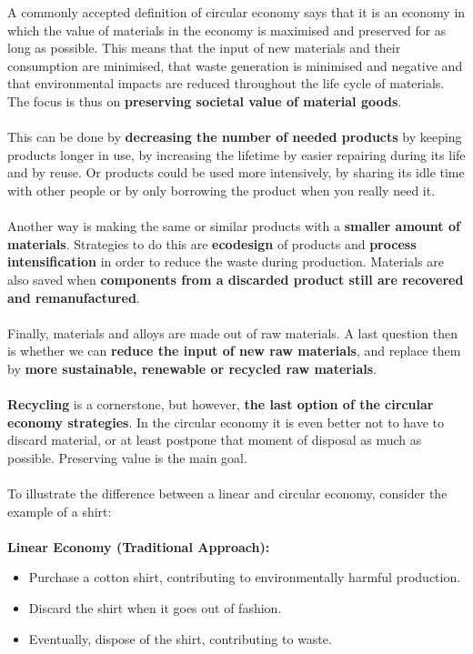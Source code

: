 \documentclass[../summary.tex]{subfiles}
\begin{document}
	A commonly accepted definition of circular economy says that it is an economy in which the value of materials in the economy is maximised and preserved for as long as possible. This means that the input of new materials and their consumption are minimised, that waste generation is minimised and negative and that environmental impacts are reduced throughout the life cycle of materials. The focus is thus on \textbf{preserving societal value of material goods}.
	\\\\
	This can be done by \textbf{decreasing the number of needed products} by keeping products longer in use, by increasing the lifetime by easier repairing during its life and by reuse. Or products could be used more intensively, by sharing its idle time with other people or by only borrowing the product when you really need it.
	\\\\
	Another way is making the same or similar products with a \textbf{smaller amount of materials}. Strategies to do this are \textbf{ecodesign} of products and \textbf{process intensification} in order to reduce the waste during production. Materials are also saved when \textbf{components from a discarded product still are recovered and remanufactured}.
	\\\\
	Finally, materials and alloys are made out of raw materials. A last question then is whether we can \textbf{reduce the input of new raw materials}, and replace them by \textbf{more sustainable, renewable or recycled raw materials}. 
	\\\\
	\textbf{Recycling} is a cornerstone, but however, \textbf{the last option of the circular economy strategies}. In the circular economy it is even better not to have to discard material, or at least postpone that moment of disposal as much as possible. Preserving value is the main goal.
	\\\\
	To illustrate the difference between a linear and circular economy, consider the example of a shirt:\\
	\\
	\textbf{Linear Economy (Traditional Approach):}
	\begin{itemize}
		\itemsep0em 
		\item Purchase a cotton shirt, contributing to environmentally harmful production.
		\item Discard the shirt when it goes out of fashion.
		\item Eventually, dispose of the shirt, contributing to waste.
	\end{itemize}
\end{document}
